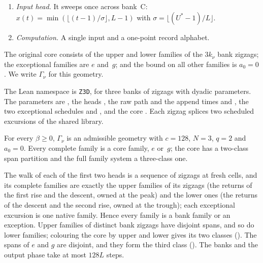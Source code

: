 \begin{definition}
\begin{enumerate}[label=(\roman*)]
bank~B, reaching level $l$ at time $O_B-l$, and rises earlier. Level $0$ departs at
time $0$; for $l\ge1$, the level that reaches the bank-B time at offset $0\le r<2w_kL$
from the start of $\ZB_k$ departs at the landing time
\[
 U_k+\psi_k\bigl(\lfloor4w_kL\,\vdc(k)\rfloor+w_kL-r\bigr),
\]
where $\psi_k(z)=2z$ for $0\le z\le4w_kL$ (a landing in the second rise of $\ZC_k$),
$\psi_k(z)=z$ for $z<0$ and $\psi_k(z)=4w_kL+z$ for $z>4w_kL$ (parking in the descents
of $\ZC_k$ and $\ZC_{k+1}$, or, for $k=k_\nu$, shortly after bank~C).
\item \emph{Input head.} It sweeps once across bank~C:
$x(t)=\min(\lfloor(t-1)/\sigma\rfloor,L-1)$ with $\sigma=\lfloor(U^*-1)/L\rfloor$.
\item \emph{Computation.} A single input and a one-point record alphabet.
\end{enumerate}
The original core consists of the upper and lower families of the $3k_\nu$ bank
zigzags; the exceptional families are $e$ and~$g$; and the bound on all other families
is $a_0=0$. We write $\Gamma_\nu$ for this geometry.
\end{definition}

The Lean namespace is \texttt{Z3D}, for three banks of zigzags with dyadic parameters. The
parameters are , the heads
, the raw path and the append times
 and , the two
exceptional schedules  and
, and the core
. Each zigzag splices two scheduled excursions of the
shared library.

\begin{lemma}[Admissibility]\label{lem:sharp-admissible}
For every $\beta\ge0$, $\Gamma_\nu$ is an admissible geometry with $c=128$, $N=3$,
$q=2$ and $a_0=0$. Every complete family is a core family, $e$ or~$g$; the core has a
two-class span partition and the full family system a three-class one.
\end{lemma}

\begin{outline}
The walk of each of the first two heads is a sequence of zigzags at fresh cells, and its
complete families are exactly the upper families of its zigzags (the returns of the
first rise and the descent, owned at the peak) and the lower ones (the returns of the
descent and the second rise, owned at the trough); each exceptional excursion is one
native family. Hence every family is a bank family or an exception. Upper families of
distinct bank zigzags have disjoint spans, and so do lower families; colouring the core
by upper and lower gives its two classes ().
The spans of $e$ and $g$ are disjoint, and they form the third class
(). The banks and the output phase take at
most $128L$ steps.
\end{outline}

